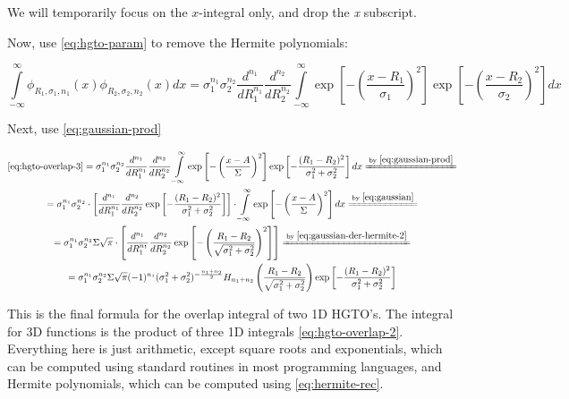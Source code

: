 \documentclass{article}
\newcommand{\equalby}[1]{\xlongequal{\text{by }\eqref{#1}}}
\begin{document}
\begin{appendices}
We will temporarily focus on the \begin{math}x\end{math}-integral only, and drop the \textit{x} subscript.

Now, use \eqref{eq:hgto-param} to remove the Hermite polynomials:

\begin{equation} \label{eq:hgto-overlap-3}
\int\limits_{-\infty}^\infty \phi_{R_1,\sigma_1,n_1}(x)\phi_{R_2,\sigma_2,n_2}(x) dx =
\sigma_1^{n_1}\sigma_2^{n_2} \frac{d^{n_1}}{dR_1^{n_1}} \frac{d^{n_2}}{dR_2^{n_2}} \int\limits_{-\infty}^\infty \exp\left[-\left(\frac{x-R_1}{\sigma_1}\right)^2\right] \exp\left[-\left(\frac{x-R_2}{\sigma_2}\right)^2\right] dx
\end{equation}

Next, use \eqref{eq:gaussian-prod}

\begin{equation} \label{eq:hgto-overlap}
\begin{gathered}
\eqref{eq:hgto-overlap-3} = \sigma_1^{n_1}\sigma_2^{n_2} \frac{d^{n_1}}{dR_1^{n_1}} \frac{d^{n_2}}{dR_2^{n_2}} \int\limits_{-\infty}^\infty \exp\left[-\left(\frac{x-A}{\Sigma}\right)^2\right]\exp\left[-\frac{(R_1-R_2)^2}{\sigma_1^2 + \sigma_2^2}\right] dx \equalby{eq:gaussian-prod} \\
= \sigma_1^{n_1}\sigma_2^{n_2} \cdot \left[ \frac{d^{n_1}}{dR_1^{n_1}} \frac{d^{n_2}}{dR_2^{n_2}} \exp\left[-\frac{(R_1-R_2)^2}{\sigma_1^2 + \sigma_2^2}\right] \right] \cdot \int\limits_{-\infty}^\infty \exp\left[-\left(\frac{x-A}{\Sigma}\right)^2\right] dx \equalby{eq:gaussian} \\
= \sigma_1^{n_1}\sigma_2^{n_2} \Sigma \sqrt\pi \cdot \left[ \frac{d^{n_1}}{dR_1^{n_1}} \frac{d^{n_2}}{dR_2^{n_2}} \exp\left[-\left(\frac{R_1-R_2}{\sqrt{\sigma_1^2 + \sigma_2^2}}\right)^2\right] \right] \equalby{eq:gaussian-der-hermite-2} \\
= \sigma_1^{n_1}\sigma_2^{n_2} \Sigma \sqrt\pi (-1)^{n_1} (\sigma_1^2+\sigma_2^2)^{-\frac{n_1+n_2}{2}} H_{n_1+n_2}\left(\frac{R_1-R_2}{\sqrt{\sigma_1^2 + \sigma_2^2}}\right) \exp\left[-\frac{(R_1-R_2)^2}{\sigma_1^2 + \sigma_2^2}\right]
\end{gathered}
\end{equation}

This is the final formula for the overlap integral of two 1D HGTO's. The integral for 3D functions is the product of three 1D integrals \eqref{eq:hgto-overlap-2}. Everything here is just arithmetic, except square roots and exponentials, which can be computed using standard routines in most programming languages, and Hermite polynomials, which can be computed using \eqref{eq:hermite-rec}.


\end{appendices}
\end{document}
